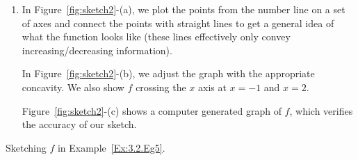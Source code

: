 \begin{example}
\begin{enumerate}[1)]
\item In Figure~\ref{fig:sketch2}-(a), we plot the points from the number line on a set of axes and connect the points with straight lines to get a general idea of what the function looks like (these lines effectively only convey increasing/decreasing information). 

In Figure~\ref{fig:sketch2}-(b), we adjust the graph with the appropriate concavity. We also show $f$ crossing the $x$ axis at $x=-1$ and $x=2$.

Figure~\ref{fig:sketch2}-(c) shows a computer generated graph of $f$, which verifies the accuracy of our sketch.
\end{enumerate}
\end{example}

\begin{marginfigure}[-16cm] %


\caption{Sketching $f$ in Example~\ref{Ex:3.2.Eg5}.}
\label{fig:sketch2}
\end{marginfigure}